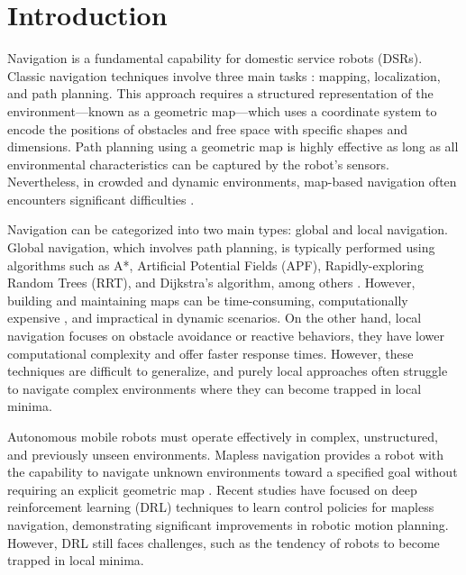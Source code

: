 \documentclass[robotics,article,submit,pdftex,moreauthors]{Definitions/mdpi}
\begin{document}
\section{Introduction}

Navigation is a fundamental capability for domestic service robots (DSRs). Classic navigation techniques involve three main tasks \citep{placed2023surveyactivesimultaneouslocalization, 10.11648/j.frontiers.20240403.13, Valencia2018, gao2017path, 7784311}: mapping, localization, and path planning. This approach requires a structured representation of the environment—known as a geometric map—which uses a coordinate system to encode the positions of obstacles and free space with specific shapes and dimensions. Path planning using a geometric map is highly effective as long as all environmental characteristics can be captured by the robot's sensors. Nevertheless, in crowded and dynamic environments, map-based navigation often encounters significant difficulties \citep{duberg2024dufomapefficientdynamicawareness, 10.1109/TRO.2016.2624754}. 

Navigation can be categorized into two main types: global and local navigation. Global navigation, which involves path planning, is typically performed using algorithms such as A*, Artificial Potential Fields (APF), Rapidly-exploring Random Trees (RRT), and Dijkstra's algorithm, among others \citep{Navigation_2D_LIDAR, Acomp_study_robot_nav}.  However, building and maintaining maps can be time-consuming, computationally expensive \citep{ir.2024.17, 10.1109/TRO.2016.2624754}, and impractical in dynamic scenarios. On the other hand, local navigation focuses on obstacle avoidance or reactive behaviors, they have lower computational complexity and offer faster response times. However, these techniques are difficult to generalize, and purely local approaches often struggle to navigate complex environments where they can become trapped in local minima.

Autonomous mobile robots must operate effectively in complex, unstructured, and previously unseen environments. Mapless navigation provides a robot with the capability to navigate unknown environments toward a specified goal without requiring an explicit geometric map \citep{pmlr-v229-liang23a}. Recent studies have focused on deep reinforcement learning (DRL) techniques to learn control policies for mapless navigation, demonstrating significant improvements in robotic motion planning. However, DRL still faces challenges, such as the tendency of robots to become trapped in local minima.
\end{document}
